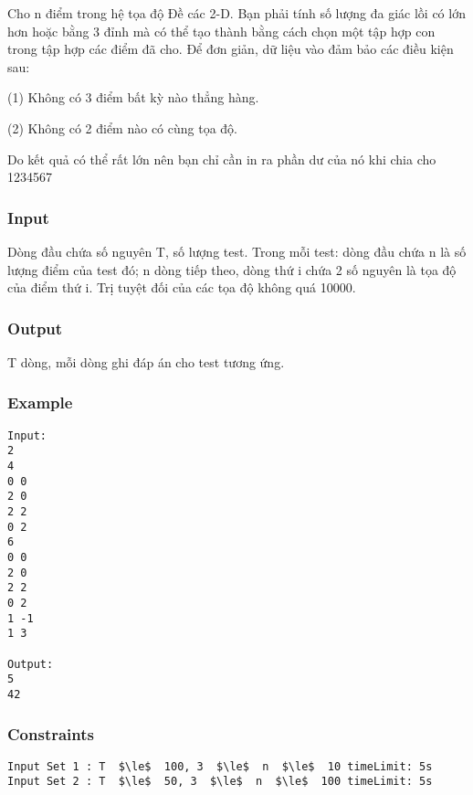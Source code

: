 



   Cho n điểm trong hệ tọa độ Đề các 2-D. Bạn phải tính số lượng đa giác lồi có lớn hơn hoặc bằng 3 đỉnh mà có thể tạo thành bằng cách chọn một tập hợp con trong tập hợp các điểm đã cho. Để đơn giản, dữ liệu vào đảm bảo các điều kiện sau:  
\begin{itemize}

    (1) Không có 3 điểm bất kỳ nào thẳng hàng.   

    (2) Không có 2 điểm nào có cùng tọa độ.   
\end{itemize}

   Do kết quả có thể rất lớn nên bạn chỉ cần in ra phần dư của nó khi chia cho 1234567  

\subsubsection{   Input  }

   Dòng đầu chứa số nguyên T, số lượng test. Trong mỗi test: dòng đầu chứa n là số lượng điểm của test đó; n dòng tiếp theo, dòng thứ i chứa 2 số nguyên là tọa độ của điểm thứ i. Trị tuyệt đối của các tọa độ không quá 10000.  

\subsubsection{   Output  }

   T dòng, mỗi dòng ghi đáp án cho test tương ứng.  

\subsubsection{   Example  }
\begin{verbatim}
Input:
2
4
0 0
2 0
2 2
0 2
6
0 0
2 0
2 2
0 2
1 -1
1 3

Output:
5
42
\end{verbatim}

\subsubsection{   Constraints  }
\begin{verbatim}
Input Set 1 : T  $\le$  100, 3  $\le$  n  $\le$  10 timeLimit: 5s  
Input Set 2 : T  $\le$  50, 3  $\le$  n  $\le$  100 timeLimit: 5s 
\end{verbatim}
